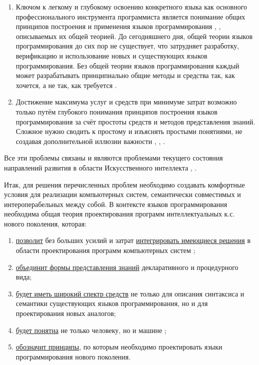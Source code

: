 \begin{enumerate}
    \item Ключом к легкому и глубокому освоению конкретного языка как основного профессионального инструмента программиста является понимание общих принципов построения и применения языков программирования \cite{Turner2007}, \cite{Constanta2022}, описываемых их общей теорией. До сегодняшнего дня, общей теории языков программирования до сих пор не существует, что затрудняет разработку, верификацию и использование новых и существующих языков программирования. Без общей теории языков программирования каждый может разрабатывать принципиально общие методы и средства так, как хочется, а не так, как требуется \cite{Golenkov2012}.
    \item Достижение максимума услуг и средств при минимуме затрат возможно только путём глубокого понимания принципов построения языков программирования за счёт простоты средств и методов представления знаний. Сложное нужно сводить к простому и изъяснять простыми понятиями, не создавая дополнительной иллюзии важности \cite{Sellitto2022}, \cite{Chaparro2014}, \cite{Posnett2011}.
\end{enumerate}

Все эти проблемы связаны и являются проблемами текущего состояния направлений развития в области Искусственного интеллекта \cite{Skeeter2020}, \cite{Constanta2022}.

Итак, для решения перечисленных проблем необходимо создавать комфортные условия для реализации компьютерных систем, семантически совместимых и интероперабельных между собой. В контексте языков программирования необходима общая теория проектирования программ интеллектуальных к.с. нового поколения, которая:
\begin{enumerate}
    \item \underline{позволит} без больших усилий и затрат \underline{интегрировать имеющиеся решения} в области проектирования программ компьютерных систем \cite{Golenkov2019};
    \item \underline{объединит формы представления знаний} декларативного и процедурного вида;
    \item \underline{будет иметь широкий спектр средств} не только для описания синтаксиса и семантики существующих языков программирования, но и для проектирования новых аналогов;
    \item \underline{будет понятна} не только человеку, но и машине \cite{Zapata2010};
    \item \underline{обозначит принципы}, по которым необходимо проектировать языки программирования нового поколения.
\end{enumerate}

